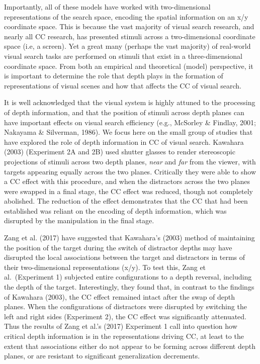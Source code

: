 \documentclass[
  english,
  man,floatsintext]{apa7}
\begin{document}
Importantly, all of these models have worked with two-dimensional representations of the search space, encoding the spatial information on an x/y coordinate space. This is because the vast majority of visual search research, and nearly all CC research, has presented stimuli across a two-dimensional coordinate space (i.e, a screen). Yet a great many (perhaps the vast majority) of real-world visual search tasks are performed on stimuli that exist in a three-dimensional coordinate space. From both an empirical and theoretical (model) perspective, it is important to determine the role that depth plays in the formation of representations of visual scenes and how that affects the CC of visual search.

It is well acknowledged that the visual system is highly attuned to the processing of depth information, and that the position of stimuli across depth planes can have important effects on visual search efficiency (e.g., McSorley \& Findlay, 2001; Nakayama \& Silverman, 1986). We focus here on the small group of studies that have explored the role of depth information in CC of visual search. Kawahara (2003) (Experiment 2A and 2B) used shutter glasses to render stereoscopic projections of stimuli across two depth planes, \emph{near} and \emph{far} from the viewer, with targets appearing equally across the two planes. Critically they were able to show a CC effect with this procedure, and when the distractors across the two planes were swapped in a final stage, the CC effect was reduced, though not completely abolished. The reduction of the effect demonstrates that the CC that had been established was reliant on the encoding of depth information, which was disrupted by the manipulation in the final stage.

Zang et al. (2017) have suggested that Kawahara's (2003) method of maintaining the position of the target during the switch of distractor depths may have disrupted the local associations between the target and distractors in terms of their two-dimensional representations (x/y). To test this, Zang et al.~(Experiment 1) subjected entire configurations to a depth reversal, including the depth of the target. Interestingly, they found that, in contrast to the findings of Kawahara (2003), the CC effect remained intact after the swap of depth planes. When the configurations of distractors were disrupted by switching the left and right sides (Experiment 2), the CC effect was significantly attenuated. Thus the results of Zang et al.'s (2017) Experiment 1 call into question how critical depth information is in the representations driving CC, at least to the extent that associations either do not appear to be forming across different depth planes, or are resistant to significant generalization decrements.
\end{document}
